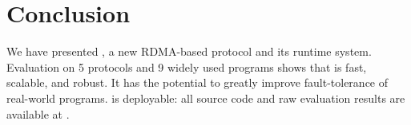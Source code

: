 \section{Conclusion}\label{sec:conclusion}

We have presented \xxx, a new RDMA-based \paxos protocol and its runtime 
system. Evaluation on 5 \paxos protocols and 9 widely used programs 
shows that \xxx is fast, scalable, and robust. It has the potential to greatly 
improve fault-tolerance of real-world programs. \xxx is deployable: all 
source code and raw evaluation results are 
available at \github.
